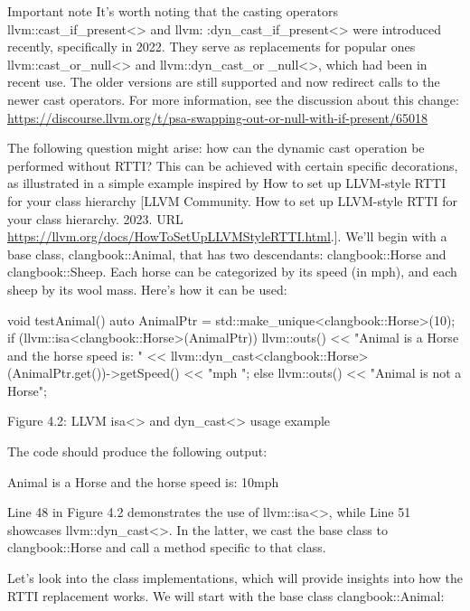 \begin{myNotic}{Important note}
It's worth noting that the casting operators llvm::cast\_if\_present<> and llvm: :dyn\_cast\_if\_present<> were introduced recently, specifically in 2022. They serve as replacements for popular ones llvm::cast\_or\_null<> and llvm::dyn\_cast\_or \_null<>, which had been in recent use. The older versions are still supported and now redirect calls to the newer cast operators. For more information, see the discussion about this change: \url{https://discourse.llvm.org/t/psa-swapping-out-or-null-with-if-present/65018}
\end{myNotic}

The following question might arise: how can the dynamic cast operation be performed without RTTI? This can be achieved with certain specific decorations, as illustrated in a simple example inspired by How to set up LLVM-style RTTI for your class hierarchy [LLVM Community. How to set up LLVM-style RTTI for your class hierarchy. 2023. URL \url{https://llvm.org/docs/HowToSetUpLLVMStyleRTTI.html}.]. We'll begin with a base class, clangbook::Animal, that has two descendants: clangbook::Horse and clangbook::Sheep. Each horse can be categorized by its speed (in mph), and each sheep by its wool mass. Here's how it can be used:

\begin{cpp}
void testAnimal() {
  auto AnimalPtr = std::make_unique<clangbook::Horse>(10);
  if (llvm::isa<clangbook::Horse>(AnimalPtr)) {
    llvm::outs()
      << "Animal is a Horse and the horse speed is: "
      << llvm::dyn_cast<clangbook::Horse>(AnimalPtr.get())->getSpeed()
      << "mph \n";
  } else {
    llvm::outs() << "Animal is not a Horse\n";
  }
}
\end{cpp}

\begin{center}
Figure 4.2: LLVM isa<> and dyn\_cast<> usage example
\end{center}

The code should produce the following output:

\begin{shell}
Animal is a Horse and the horse speed is: 10mph
\end{shell}

Line 48 in Figure 4.2 demonstrates the use of llvm::isa<>, while Line 51 showcases llvm::dyn\_cast<>. In the latter, we cast the base class to clangbook::Horse and call a method specific to that class.

Let's look into the class implementations, which will provide insights into how the RTTI replacement works. We will start with the base class clangbook::Animal:

